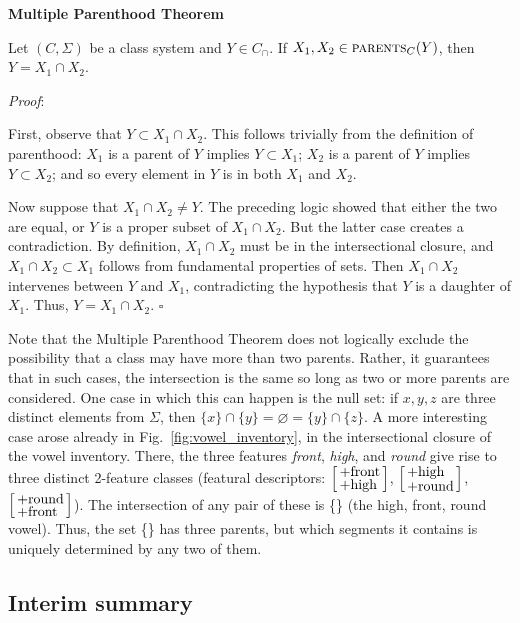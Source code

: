\documentclass[12pt, oneside]{article}   	%
\newenvironment{clump}
{
	\edef\myindent{\the\parindent}
	\noindent\begin{minipage}{\textwidth}
	\setlength\parindent{\myindent}\fussy
}
{
	\end{minipage}
}
\newcommand{\featmattwo}[2]{$\begin{bsmallmatrix*}[l]\text{\normalsize #1}\\\text{\normalsize #2}\end{bsmallmatrix*}$}
\begin{document}
\begin{clump}
\vspace{\baselineskip} \noindent \textbf{Multiple Parenthood Theorem}

\noindent Let $(C, \Sigma)$ be a class system and $Y \in C_\cap$. If $X_1, X_2 \in \textsc{parents}_C(Y)$, then $Y = X_1 \cap X_2$.
\end{clump}

\noindent \textit{Proof}:

First, observe that $Y \subset X_1 \cap X_2$. This follows trivially from the definition of parenthood: $X_1$ is a parent of $Y$ implies $Y \subset X_1$; $X_2$ is a parent of $Y$ implies $Y \subset X_2$; and so every element in $Y$ is in both $X_1$ and $X_2$.

Now suppose that $X_1 \cap X_2 \neq Y$. The preceding logic showed that either the two are equal, or $Y$ is a proper subset of $X_1 \cap X_2$. But the latter case creates a contradiction. By definition, $X_1 \cap X_2$ must be in the intersectional closure, and $X_1 \cap X_2 \subset X_1$ follows from fundamental properties of sets. Then $X_1 \cap X_2$ intervenes between $Y$ and $X_1$, contradicting the hypothesis that $Y$ is a daughter of $X_1$. Thus, $Y = X_1 \cap X_2$. $\square$

\vspace{0.5\baselineskip} Note that the Multiple Parenthood Theorem does not logically exclude the possibility that a class may have more than two parents. Rather, it guarantees that in such cases, the intersection is the same so long as two or more parents are considered. One case in which this can happen is the null set: if $x, y, z$ are three distinct elements from $\Sigma$, then $\{ x \} \cap \{ y \} = \varnothing = \{ y \} \cap \{ z \}$. A more interesting case arose already in Fig.~\ref{fig:vowel_inventory}, in the intersectional closure of the vowel inventory. There, the three features \textit{front}, \textit{high}, and \textit{round} give rise to three distinct 2-feature classes (featural descriptors: \featmattwo{+front}{+high}, \featmattwo{+high}{+round}, \featmattwo{+round}{+front}). The intersection of any pair of these is \{\} (the high, front, round vowel). Thus, the set  \{\} has three parents, but which segments it contains is uniquely determined by any two of them.

\subsection{Interim summary}
\end{document}
